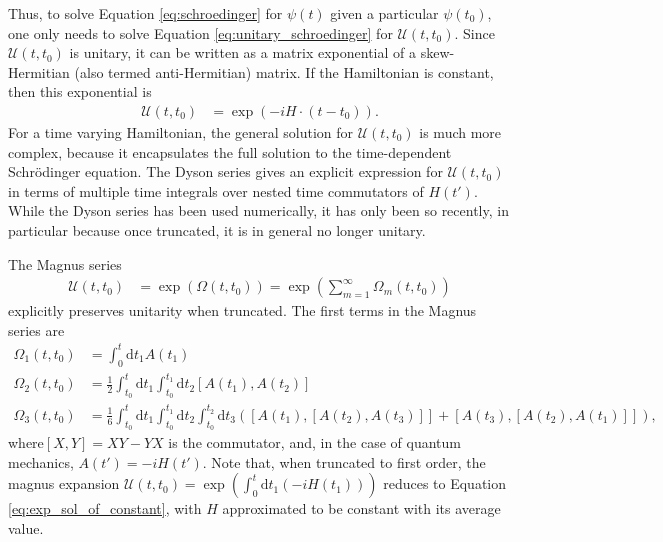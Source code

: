 \documentclass{jors}
\begin{document}
		Thus, to solve Equation \eqref{eq:schroedinger} for \(\psi(t)\) given a particular \(\psi(t_0)\), one only needs to solve Equation \eqref{eq:unitary_schroedinger} for \(\mathcal{U}(t, t_0)\).
		Since \(\mathcal{U}(t, t_0)\) is unitary, it can be written as a matrix exponential of a skew-Hermitian (also termed anti-Hermitian) matrix.
		If the Hamiltonian is constant, then this exponential is %
		\begin{align}
			\mathcal{U}(t, t_0) &= \exp(-i H\cdot(t - t_0)).\label{eq:exp_sol_of_constant}
		\end{align}
		For a time varying Hamiltonian, the general solution for \(\mathcal{U}(t, t_0)\) is much more complex, because it encapsulates the full solution to the time-dependent Schr\"{o}dinger equation.
		The Dyson series\cite{kalev_integral-free_2020} gives an explicit expression for \(\mathcal{U}(t, t_0)\) in terms of multiple time integrals over nested time commutators of \(H(t')\).
		While the Dyson series has been used numerically\cite{kalev_integral-free_2020}, it has only been so recently, in particular because once truncated, it is in general no longer unitary.

		The Magnus series
		\begin{align}
			\mathcal{U}(t, t_0) &= \exp\left(\Omega(t, t_0)\right) = \exp\left(\sum_{m = 1}^\infty \Omega_m(t, t_0)\right)
		\end{align}
		explicitly preserves unitarity when truncated\cite{magnus_exponential_1954}.
		The first terms in the Magnus series are\cite{blanes_magnus_2009}
		\begin{align}
			\Omega_1(t, t_0) &= \int_0^t\mathrm{d}t_1A(t_1)\\
			\Omega_2(t, t_0) &= \frac12\int_{t_0}^t\mathrm{d}t_1\int_{t_0}^{t_1}\mathrm{d}t_2[A(t_1), A(t_2)]\\
			\Omega_3(t, t_0) &= \frac16\int_{t_0}^t\mathrm{d}t_1\int_{t_0}^{t_1}\mathrm{d}t_2\int_{t_0}^{t_2}\mathrm{d}t_3\left([A(t_1), [A(t_2), A(t_3)]] + [A(t_3), [A(t_2), A(t_1)]]\right),
		\end{align}
		where\([X, Y] = XY - YX\) is the commutator, and, in the case of quantum mechanics, \(A(t') = -iH(t')\). Note that, when truncated to first order, the magnus expansion \(\mathcal{U}(t, t_0) = \exp\left(\int_0^t\mathrm{d}t_1\left(-iH(t_1)\right)\right)\) reduces to Equation \eqref{eq:exp_sol_of_constant}, with \(H\) approximated to be constant with its average value.
\end{document}
